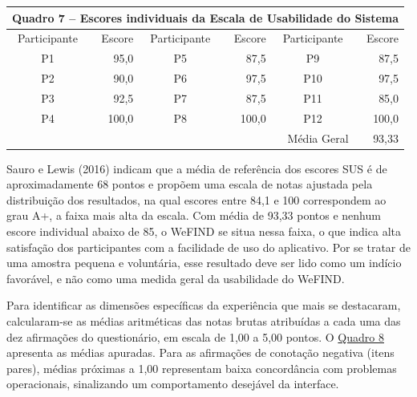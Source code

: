 \begin{table}[H]
    \centering
    \hypertarget{quadro:escores_sus}{}\label{quadro:escores_sus}
    \small
    \renewcommand{\arraystretch}{1.15}
    \begin{tabular}{|c|r|c|r|c|r|}
        \hline
        \multicolumn{6}{|c|}{Quadro 7 -- Escores individuais da Escala de Usabilidade do Sistema} \\ \hline
        Participante & Escore &
        Participante & Escore &
        Participante & Escore \\ \hline
        P1 & 95,0 & P5 & 87,5 & P9 & 87,5 \\ \hline
        P2 & 90,0 & P6 & 97,5 & P10 & 97,5 \\ \hline
        P3 & 92,5 & P7 & 87,5 & P11 & 85,0 \\ \hline
        P4 & 100,0 & P8 & 100,0 & P12 & 100,0 \\ \hline
        \multicolumn{5}{|r|}{Média Geral} & 93,33 \\ \hline
    \end{tabular}
\end{table}

Sauro e Lewis (2016) indicam que a média de referência dos escores SUS é de aproximadamente 68 pontos e propõem uma escala de notas ajustada pela distribuição dos resultados, na qual escores entre 84,1 e 100 correspondem ao grau A+, a faixa mais alta da escala. Com média de 93,33 pontos e nenhum escore individual abaixo de 85, o WeFIND se situa nessa faixa, o que indica alta satisfação dos participantes com a facilidade de uso do aplicativo. Por se tratar de uma amostra pequena e voluntária, esse resultado deve ser lido como um indício favorável, e não como uma medida geral da usabilidade do WeFIND.

Para identificar as dimensões específicas da experiência que mais se destacaram, calcularam-se as médias aritméticas das notas brutas atribuídas a cada uma das dez afirmações do questionário, em escala de 1,00 a 5,00 pontos. O \hyperref[quadro:medias_itens_sus]{Quadro 8} apresenta as médias apuradas. Para as afirmações de conotação negativa (itens pares), médias próximas a 1,00 representam baixa concordância com problemas operacionais, sinalizando um comportamento desejável da interface.

